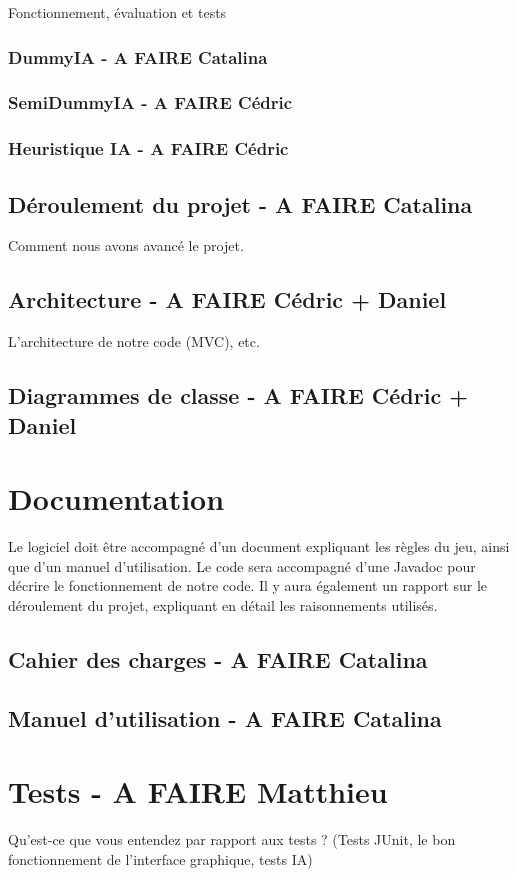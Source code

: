 \documentclass[11pt, letterpaper]{article}
\begin{document}
\noindent
Fonctionnement, évaluation et tests

\subsubsection{DummyIA - A FAIRE Catalina}

\subsubsection{SemiDummyIA - A FAIRE Cédric}

\subsubsection{Heuristique IA - A FAIRE Cédric}

\subsection{Déroulement du projet - A FAIRE Catalina}

\noindent
Comment nous avons avancé le projet.

\subsection{Architecture - A FAIRE Cédric + Daniel}

\noindent
L'architecture de notre code (MVC), etc.

\subsection{Diagrammes de classe - A FAIRE Cédric + Daniel}

\section{Documentation}

\noindent
Le logiciel doit être accompagné d’un document expliquant les règles du jeu, ainsi que d’un manuel d’utilisation. Le code sera accompagné d'une Javadoc pour décrire le fonctionnement de notre code. Il y aura également un rapport sur le déroulement du projet, expliquant en détail les raisonnements utilisés.

\subsection{Cahier des charges - A FAIRE Catalina}

\subsection{Manuel d'utilisation - A FAIRE Catalina}

\section{Tests - A FAIRE Matthieu}

\noindent
Qu'est-ce que vous entendez par rapport aux tests ? (Tests JUnit, le bon fonctionnement de l'interface graphique, tests IA)
\end{document}
